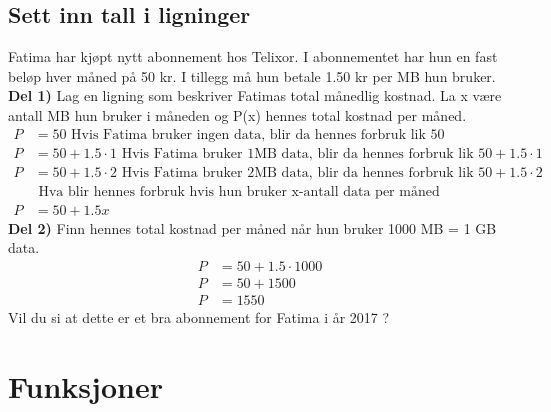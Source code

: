 \documentclass[12pt,twoside,onecolumn]{article}
\begin{document}
\subsection*{Sett inn tall i ligninger}
\begin{Exercise}
Fatima har kjøpt nytt abonnement hos Telixor. I abonnementet har hun en fast beløp hver måned på 50 kr. I tillegg må hun betale 1.50 kr per MB hun bruker. 
\newline\newline
\textbf{Del 1)} Lag en ligning som beskriver Fatimas total månedlig kostnad. La x være antall MB hun bruker i måneden og P(x) hennes total kostnad per måned.
\begin{align}
P &= 50 \text{ Hvis Fatima bruker ingen data, blir da hennes forbruk lik 50}\\ 
P &= 50 + 1.5\cdot1\text{ Hvis Fatima bruker 1MB data, blir da hennes forbruk lik $50 + 1.5\cdot1$}\\ 
P &= 50 + 1.5\cdot2\text{ Hvis Fatima bruker 2MB data, blir da hennes forbruk lik $50 + 1.5\cdot2$}\\ 
&\text{ Hva blir hennes forbruk hvis hun bruker x-antall data per måned} \nonumber\\
P &= 50 + 1.5x
\end{align}
\newline
\textbf{Del 2)}
Finn hennes total kostnad per måned når hun bruker 1000 MB = 1 GB data.
\begin{align}
P &= 50 + 1.5\cdot1000\\
P &= 50 + 1500\\
P &= 1550
\end{align}
Vil du si at dette er et bra abonnement for Fatima i år 2017 ?
\end{Exercise}

\section*{Funksjoner}
\end{document}
